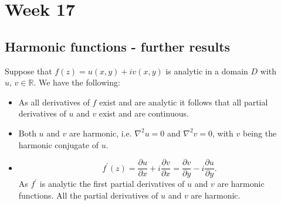 \documentclass{article}
\begin{document}
\section{Week 17}
\subsection{Harmonic functions - further results}
Suppose that $f(z)=u(x,y) + iv(x,y)$ is analytic in a domain $D$ with $u,\,v\in \mathbb{R}$. We have the following:
\begin{itemize}
    \item As all derivatives of $f$ exist and are analytic it follows that all partial derivatives of $u$ and $v$ exist and are continuous.
    \item Both $u$ and $v$ are harmonic, i.e. $\nabla^2u = 0$ and $\nabla^2 v=0$, with $v$ being the harmonic conjugate of $u$.
    \item \begin{equation}
        f^\prime(z) = \frac{\partial u}{\partial x} + i\frac{\partial v}{\partial x} = \frac{\partial v}{\partial y} - i\frac{\partial u}{\partial y}.
    \end{equation}
    As $f^\prime$ is analytic the first partial derivatives of $u$ and $v$ are harmonic functions. All the partial derivatives of $u$ and $v$ are harmonic.
\end{itemize}
\end{document}
